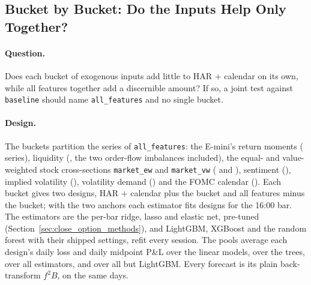 \ifdefined\bkNSeries\else\fi
\subsection{Bucket by Bucket: Do the Inputs Help Only Together?}
\label{sec:app_buckets}

\paragraph{Question.} Does each bucket of exogenous inputs add little to HAR + calendar on
its own, while all features together add a discernible amount? If so, a joint test against
\texttt{baseline} should name \texttt{all\_features} and no single bucket.

\paragraph{Design.} The \bkNBuckets{} buckets partition the \bkNSeries{} series of
\texttt{all\_features}: the E-mini's return moments (\bkSizeMom{} series), liquidity
(\bkSizeLiq, the two order-flow imbalances included), the equal- and value-weighted stock
cross-sections \texttt{market\_ew} and \texttt{market\_vw} (\bkSizeMew{} and \bkSizeMvw),
sentiment (\bkSizeSent), implied volatility (\bkSizeIv), volatility demand (\bkSizeVd) and the
FOMC calendar (\bkSizeFomc). Each bucket gives two designs, HAR + calendar plus the bucket
and all features minus the bucket; with the two anchors each estimator fits \bkNDesigns{}
designs for the 16:00 bar. The estimators are the per-bar ridge, lasso and elastic net,
pre-tuned (Section~\ref{sec:close_option_methods}), and LightGBM, XGBoost and the random
forest with their shipped settings, refit every session. The \bkNPools{} pools average each
design's daily loss and daily midpoint P\&L over the linear models, over the trees, over all
\bkNEst{} estimators, and over all but LightGBM. Every forecast is its plain back-transform
$f^{2}B$, on the same \bkDays{} days.

